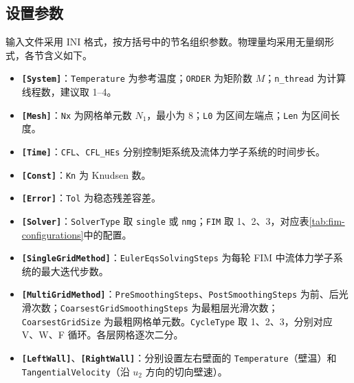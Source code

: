 \documentclass[UTF8,a4paper,11pt,fontset=fandol]{ctexart}
\newcommand{\code}[1]{\nolinkurl{#1}}
\begin{document}
\subsection{设置参数}
输入文件采用 INI 格式，按方括号中的节名组织参数。物理量均采用无量纲形式，各节含义如下。
\begin{itemize}[label={},leftmargin=0pt,itemsep=0.25em]\raggedright
\item \textbf{\texttt{[System]}}：\code{Temperature} 为参考温度；\code{ORDER} 为矩阶数 $M$；\code{n_thread} 为计算线程数，建议取 1--4。
\item \textbf{\texttt{[Mesh]}}：\code{Nx} 为网格单元数 $N_1$，最小为 8；\code{L0} 为区间左端点；\code{Len} 为区间长度。
\item \textbf{\texttt{[Time]}}：\code{CFL}、\code{CFL_HEs} 分别控制矩系统及流体力学子系统的时间步长。
\item \textbf{\texttt{[Const]}}：\code{Kn} 为 Knudsen 数。
\item \textbf{\texttt{[Error]}}：\code{Tol} 为稳态残差容差。
\item \textbf{\texttt{[Solver]}}：\code{SolverType} 取 \code{single} 或 \code{nmg}；\code{FIM} 取 1、2、3，对应表\ref{tab:fim-configurations}中的配置。
\item \textbf{\texttt{[SingleGridMethod]}}：\code{EulerEqsSolvingSteps} 为每轮 FIM 中流体力学子系统的最大迭代步数。
\item \textbf{\texttt{[MultiGridMethod]}}：\texttt{PreSmoothingSteps}、\texttt{PostSmoothingSteps} 为前、后光滑次数；\texttt{CoarsestGridSmoothingSteps} 为最粗层光滑次数；\texttt{CoarsestGridSize} 为最粗网格单元数。\code{CycleType} 取 1、2、3，分别对应 V、W、F 循环。各层网格逐次二分。
\item \textbf{\texttt{[LeftWall]}}、\textbf{\texttt{[RightWall]}}：分别设置左右壁面的 \code{Temperature}（壁温）和 \code{TangentialVelocity}（沿 $u_2$ 方向的切向壁速）。
\end{itemize}
\end{document}
